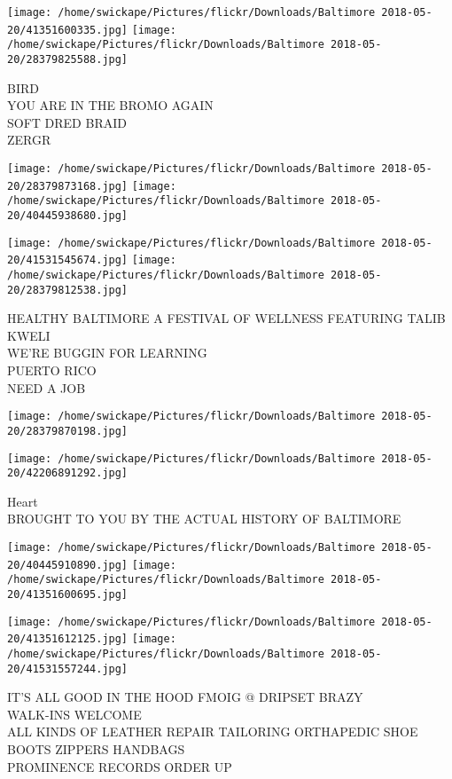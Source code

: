 \documentclass[10pt,letterpaper]{article}
\begin{document}
\texttt{[image: /home/swickape/Pictures/flickr/Downloads/Baltimore 2018-05-20/41351600335.jpg]}
\texttt{[image: /home/swickape/Pictures/flickr/Downloads/Baltimore 2018-05-20/28379825588.jpg]}

BIRD\\
YOU ARE IN THE BROMO AGAIN\\
SOFT DRED BRAID\\
ZERGR
\pagebreak

\texttt{[image: /home/swickape/Pictures/flickr/Downloads/Baltimore 2018-05-20/28379873168.jpg]}
\texttt{[image: /home/swickape/Pictures/flickr/Downloads/Baltimore 2018-05-20/40445938680.jpg]}

\texttt{[image: /home/swickape/Pictures/flickr/Downloads/Baltimore 2018-05-20/41531545674.jpg]}
\texttt{[image: /home/swickape/Pictures/flickr/Downloads/Baltimore 2018-05-20/28379812538.jpg]}

HEALTHY BALTIMORE A FESTIVAL OF WELLNESS FEATURING TALIB KWELI\\
WE'RE BUGGIN FOR LEARNING\\
PUERTO RICO\\
NEED A JOB
\pagebreak

\texttt{[image: /home/swickape/Pictures/flickr/Downloads/Baltimore 2018-05-20/28379870198.jpg]}

\vspace{0.25in}
\texttt{[image: /home/swickape/Pictures/flickr/Downloads/Baltimore 2018-05-20/42206891292.jpg]}

Heart\\
BROUGHT TO YOU BY THE ACTUAL HISTORY OF BALTIMORE
\pagebreak

\texttt{[image: /home/swickape/Pictures/flickr/Downloads/Baltimore 2018-05-20/40445910890.jpg]}
\texttt{[image: /home/swickape/Pictures/flickr/Downloads/Baltimore 2018-05-20/41351600695.jpg]}

\texttt{[image: /home/swickape/Pictures/flickr/Downloads/Baltimore 2018-05-20/41351612125.jpg]}
\texttt{[image: /home/swickape/Pictures/flickr/Downloads/Baltimore 2018-05-20/41531557244.jpg]}

IT'S ALL GOOD IN THE HOOD FMOIG @ DRIPSET BRAZY\\
WALK{-}INS WELCOME\\
ALL KINDS OF LEATHER REPAIR TAILORING ORTHAPEDIC  SHOE BOOTS ZIPPERS HANDBAGS\\
PROMINENCE RECORDS ORDER UP
\pagebreak
\end{document}
